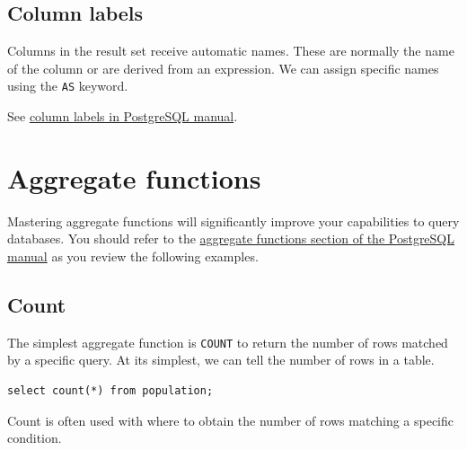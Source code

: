 \documentclass{pgnotes}
\begin{document}
\subsection{Column labels}\label{column-labels}

Columns in the result set receive automatic names. These are normally
the name of the column or are derived from an expression. We can assign
specific names using the \texttt{AS} keyword.


See
\href{https://www.postgresql.org/docs/13/queries-select-lists.html\#QUERIES-COLUMN-LABELS}{column
labels in PostgreSQL manual}.

\section{Aggregate functions}\label{aggregate-functions}

Mastering aggregate functions will significantly improve your
capabilities to query databases. You should refer to the
\href{https://www.postgresql.org/docs/13/functions-aggregate.html}{aggregate
functions section of the PostgreSQL manual} as you review the following
examples.

\subsection{Count}\label{count}

The simplest aggregate function is \texttt{COUNT} to return the number
of rows matched by a specific query. At its simplest, we can tell the
number of rows in a table.

\begin{verbatim}
select count(*) from population; 
\end{verbatim}

Count is often used with where to obtain the number of rows matching a
specific condition.
\end{document}
